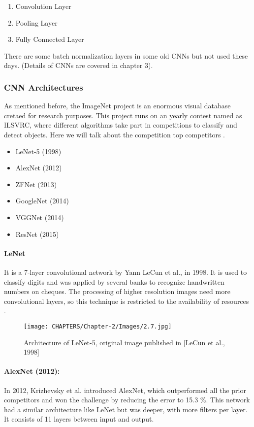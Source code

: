 \begin{enumerate}
    \item Convolution Layer
    \item Pooling Layer
    \item Fully Connected Layer

\end{enumerate}
There are some batch normalization layers in some old CNNs but not used these days. (Details of CNNs are covered in chapter 3).

\subsubsection{CNN Architectures}
As mentioned before, the ImageNet project is an enormous visual database cretaed for research purposes. This 
project runs on an yearly contest named as ILSVRC, where different algorithms take 
part in competitions to classify and detect objects. Here 
we will talk about the competition top competitors \cite{chap_2_article:9}.
\begin{itemize}
    \item LeNet-5 (1998)
    \item AlexNet (2012)
    \item ZFNet (2013)
    \item GoogleNet (2014)
    \item VGGNet (2014)
    \item ResNet (2015)
\end{itemize}
\paragraph*{LeNet}

It is a 7-layer convolutional network by 
Yann LeCun et al., in 1998. It is used to classify digits and was applied by several banks to recognize handwritten numbers on cheques. The processing of higher resolution images need more convolutional layers, so this technique is restricted to the availability of resources \cite{chap_2_article:10}.

\begin{figure}[H]
    \centering
    \captionsetup{justification=centering,margin=2cm}
    \texttt{[image: CHAPTERS/Chapter-2/Images/2.7.jpg]}
    \caption{Architecture of LeNet-5, original image published in [LeCun et al., 1998]}
    \label{fig:2.7}
\end{figure}


\paragraph*{AlexNet (2012):}
In 2012, Krizhevsky et al. introduced AlexNet, which outperformed all the prior competitors and won the challenge by reducing the error to 15.3 \%.  This network had a similar architecture like LeNet but was deeper, with more filters per layer. It consists of 11 layers between input and output. 

